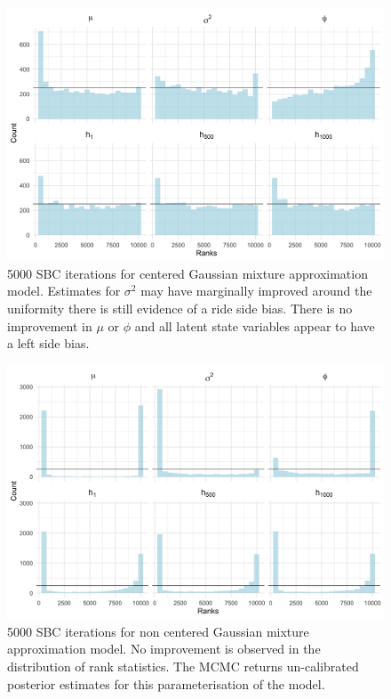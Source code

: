 \documentclass[12pt, a4paper]{article}
\begin{document}
    \begin{figure}[H]
        \centering
        \includegraphics[scale=0.09]{results/ksc_cp_5k.png}
        \caption{5000 SBC iterations for centered Gaussian mixture approximation model. Estimates for $\sigma^2$ may have marginally improved around the uniformity there is still evidence of a ride side bias. There is no improvement in $\mu$ or $\phi$ and all latent state variables appear to have a left side bias.}
        \label{fig:cpksc5k}
    \end{figure}

    \begin{figure}[H]
        \centering
        \includegraphics[scale=0.09]{results/ksc_ncp_5k.png}
        \caption{5000 SBC iterations for non centered Gaussian mixture approximation model. No improvement is observed in the distribution of rank statistics. The MCMC returns un-calibrated posterior estimates for this parameterisation of the model.}
        \label{fig:ncpksc5k}
    \end{figure}
\end{document}
